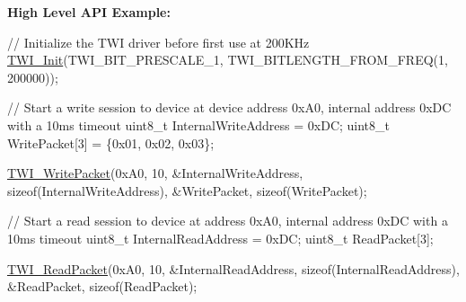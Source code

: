 {\bfseries High Level A\+PI Example\+:} 
\begin{DoxyCode}
\textcolor{comment}{// Initialize the TWI driver before first use at 200KHz}
\hyperlink{TWI__AVR8_8c_a08e1eb463ce4ec168f2c1cb9b4039cae}{TWI\_Init}(TWI\_BIT\_PRESCALE\_1, TWI\_BITLENGTH\_FROM\_FREQ(1, 200000));

\textcolor{comment}{// Start a write session to device at device address 0xA0, internal address 0xDC with a 10ms timeout}
uint8\_t InternalWriteAddress = 0xDC;
uint8\_t WritePacket[3] = \{0x01, 0x02, 0x03\};

\hyperlink{TWI__AVR8_8c_a7a9c708e4d9fbe6ed807f582bcbded0e}{TWI\_WritePacket}(0xA0, 10, &InternalWriteAddress, \textcolor{keyword}{sizeof}(InternalWriteAddress),
                &WritePacket, \textcolor{keyword}{sizeof}(WritePacket);

\textcolor{comment}{// Start a read session to device at address 0xA0, internal address 0xDC with a 10ms timeout}
uint8\_t InternalReadAddress = 0xDC;
uint8\_t ReadPacket[3];

\hyperlink{TWI__AVR8_8c_aea02d723a16ed7f11d485c24175d8117}{TWI\_ReadPacket}(0xA0, 10, &InternalReadAddress, \textcolor{keyword}{sizeof}(InternalReadAddress),
               &ReadPacket, \textcolor{keyword}{sizeof}(ReadPacket);
\end{DoxyCode}
 